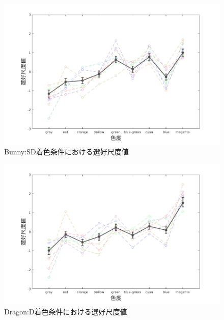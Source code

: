         \begin{figure}
            \centering
            \includegraphics[width=14.0cm]{./img/ex1_res_BSD.png}
            \caption{Bunny:SD着色条件における選好尺度値}
            \label{ex1_BSD}
        \end{figure}

        \begin{figure}
            \centering
            \includegraphics[width=14.0cm]{./img/ex1_res_DD.png}
            \caption{Dragon:D着色条件における選好尺度値}
            \label{ex1_DD}
        \end{figure}

